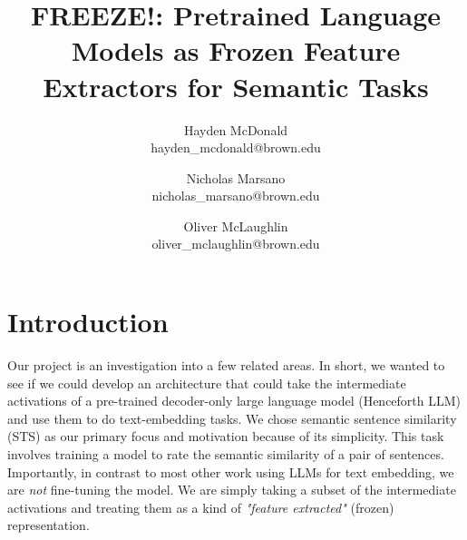 \documentclass[14pt]{article}
\title{FREEZE!: Pretrained Language Models as Frozen Feature Extractors for Semantic Tasks}
\author{
    Hayden McDonald\\hayden\_mcdonald@brown.edu \and 
    Nicholas Marsano\\nicholas\_marsano@brown.edu\and 
    Oliver McLaughlin\\oliver\_mclaughlin@brown.edu
}
\begin{document}
\maketitle


\setcounter{tocdepth}{4}
\setcounter{secnumdepth}{4}
\tableofcontents
\newpage

\section{Introduction}
Our project is an investigation into a few related areas. In short, we wanted to see if we could develop an architecture that could take the intermediate activations of a pre-trained decoder-only large language model (Henceforth LLM) and use them to do text-embedding tasks. We chose semantic sentence similarity (STS) as our primary focus and motivation because of its simplicity. This task involves training a model to rate the semantic similarity of a pair of sentences. Importantly, in contrast to most other work using LLMs for text embedding, we are \textit{not} fine-tuning the model. We are simply taking a subset of the intermediate activations and treating them as a kind of \textit{"feature extracted"} (frozen) representation.
\end{document}

